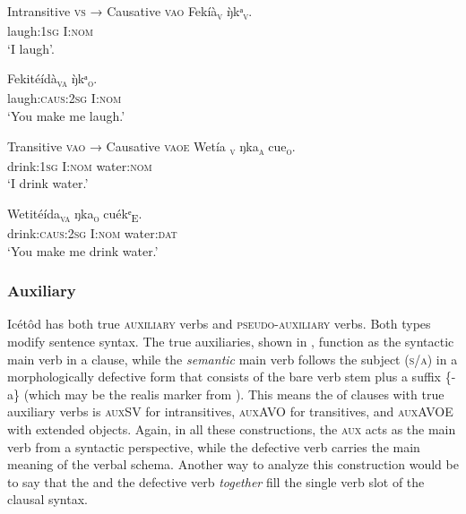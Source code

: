 Intransitive \textsc{vs} → Causative \textsc{vao}
\ea\label{ex:syn:16}
\gll Fekíà\textsc{\textsubscript{v}}     \`{ŋ}kᵃ\textsc{\textsubscript{v}}. \\
laugh:\textsc{1sg}   I:\textsc{nom}    \\
\glt ‘I laugh’. 
\z




\ea\label{ex:syn:17}
\gll Fekitéídà\textsc{\textsubscript{va}}   {\`{ŋ}kᵃ}\textsc{\textsubscript{o}}. \\
laugh:\textsc{caus:2sg} I:\textsc{nom}    \\
\glt ‘You make me laugh.’ 
\z





Transitive \textsc{vao} → Causative \textsc{vaoe}
\ea\label{ex:syn:18}
\gll Wetía\textsc{\textsubscript{ v}}     ŋka\textsc{\textsubscript{a}}     cue\textsc{\textsubscript{o}}. \\
drink:\textsc{1sg}   I:\textsc{nom}   water:\textsc{nom}    \\
\glt ‘I drink water.’ 
\z




\ea\label{ex:syn:19}
\gll Wetitéída\textsc{\textsubscript{va}}   ŋka\textsc{\textsubscript{o}}     cuékᵉ\textsc{\textsubscript{E}}. \\
drink:\textsc{caus:2sg} I:\textsc{nom}    water:\textsc{dat}    \\
\glt ‘You make me drink water.’ 
\z




\subsubsection{Auxiliary}\label{sec:10.2.5} 

Icétôd has both true \textsc{auxiliary} verbs and \textsc{pseudo-auxiliary} verbs. Both types modify sentence syntax. The true auxiliaries, shown in , function as the syntactic main verb in a clause, while the \textit{semantic} main verb follows the subject (\textsc{s/a}) in a morphologically defective form that consists of the bare verb stem plus a suffix \{-a\} (which may be the realis marker from ). This means the  of clauses with true auxiliary verbs is \textsc{auxSV} for intransitives, \textsc{auxAVO} for transitives, and \textsc{auxAVOE} with extended objects. Again, in all these constructions, the \textsc{aux} acts as the main verb from a syntactic perspective, while the defective verb carries the main meaning of the verbal schema. Another way to analyze this construction would be to say that the  and the defective verb \textit{together} fill the single verb slot of the clausal syntax.

